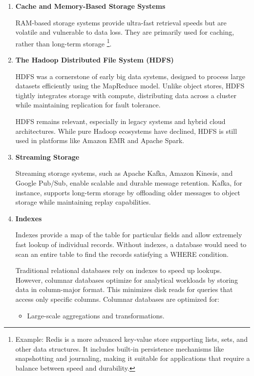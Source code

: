 \begin{enumerate}
    \item \textbf{Cache and Memory-Based Storage Systems}
    
    \noindent
    RAM-based storage systems provide ultra-fast retrieval speeds but are volatile and vulnerable to data loss.
    They are primarily used for caching, rather than long-term storage
    \footnote{
        Example: 
        Redis is a more advanced key-value store supporting lists, sets, and other data structures.
        It includes built-in persistence mechanisms like snapshotting and journaling, making it
        suitable for applications that require a balance between speed and durability.
    }.



    \item \textbf{The Hadoop Distributed File System (HDFS)}
    
    \noindent
    HDFS was a cornerstone of early big data systems, designed to process large datasets
    efficiently using the MapReduce model. Unlike object stores, HDFS tightly integrates storage
    with compute, distributing data across a cluster while maintaining replication for fault tolerance.

    HDFS remains relevant, especially in legacy systems and hybrid cloud architectures.
    While pure Hadoop ecosystems have declined, HDFS is still used in platforms like Amazon EMR and Apache Spark.



    \item \textbf{Streaming Storage}
    
    \noindent
    Streaming storage systems, such as Apache Kafka, Amazon Kinesis, and Google Pub/Sub, enable scalable
    and durable message retention. Kafka, for instance, supports long-term storage by offloading older
    messages to object storage while maintaining replay capabilities.



    \item \textbf{Indexes}
    
    \noindent
    Indexes provide a map of the table for particular fields and allow extremely fast
    lookup of individual records. Without indexes, a database would need to scan an
    entire table to find the records satisfying a WHERE condition.

    Traditional relational databases rely on indexes to speed up lookups.
    However, columnar databases optimize for analytical workloads by storing data in
    column-major format. This minimizes disk reads for queries that access only
    specific columns. Columnar databases are optimized for:
    \begin{itemize}
        \item Large-scale aggregations and transformations.
    

\end{itemize}
\end{enumerate}
